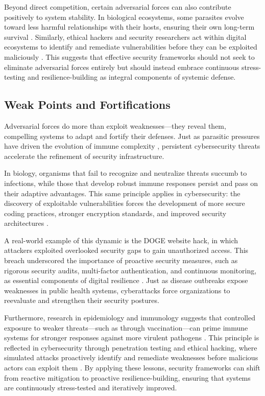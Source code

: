 \documentclass{article}
\begin{document}
Beyond direct competition, certain adversarial forces can also contribute positively to system stability. In biological ecosystems, some parasites evolve toward less harmful relationships with their hosts, ensuring their own long-term survival \citep{dobson1989population}. Similarly, ethical hackers and security researchers act within digital ecosystems to identify and remediate vulnerabilities before they can be exploited maliciously \citep{holt2012hackers}. This suggests that effective security frameworks should not seek to eliminate adversarial forces entirely but should instead embrace continuous stress-testing and resilience-building as integral components of systemic defense.

\subsection{Weak Points and Fortifications}
Adversarial forces do more than exploit weaknesses—they reveal them, compelling systems to adapt and fortify their defenses. Just as parasitic pressures have driven the evolution of immune complexity \citep{schmid2014antigenic}, persistent cybersecurity threats accelerate the refinement of security infrastructure. 

In biology, organisms that fail to recognize and neutralize threats succumb to infections, while those that develop robust immune responses persist and pass on their adaptive advantages. This same principle applies in cybersecurity: the discovery of exploitable vulnerabilities forces the development of more secure coding practices, stronger encryption standards, and improved security architectures \citep{barabasi2016network}.

A real-world example of this dynamic is the DOGE website hack, in which attackers exploited overlooked security gaps to gain unauthorized access. This breach underscored the importance of proactive security measures, such as rigorous security audits, multi-factor authentication, and continuous monitoring, as essential components of digital resilience \citep{cisa2022supply}. Just as disease outbreaks expose weaknesses in public health systems, cyberattacks force organizations to reevaluate and strengthen their security postures.

Furthermore, research in epidemiology and immunology suggests that controlled exposure to weaker threats—such as through vaccination—can prime immune systems for stronger responses against more virulent pathogens \citep{morens2020emerging}. This principle is reflected in cybersecurity through penetration testing and ethical hacking, where simulated attacks proactively identify and remediate weaknesses before malicious actors can exploit them \citep{biggio2018wild}. By applying these lessons, security frameworks can shift from reactive mitigation to proactive resilience-building, ensuring that systems are continuously stress-tested and iteratively improved.
\end{document}

